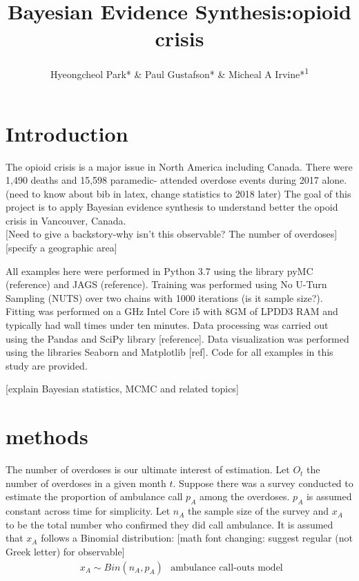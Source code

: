 \documentclass[]{article}
\title{Bayesian Evidence Synthesis:opioid crisis}
\author{Hyeongcheol Park* \& Paul Gustafson* \& Micheal A Irvine*\textsuperscript{1}}
\begin{document}
\maketitle{}
\tableofcontents %
\listoffigures %
\listoftables %


\begin{abstract}

\end{abstract}

\section{Introduction}
The opioid crisis is a major issue in North America  including Canada. There were 1,490 deaths and 15,598 paramedic- attended overdose events during 2017 alone. \cite{Irvine:modelling} (need to know about bib in latex, change statistics to 2018 later) The goal of this project is to apply Bayesian evidence synthesis to understand better the opoid crisis in Vancouver, Canada.  \\

[Need to give a backstory-why isn't this observable? The number of overdoses] 
[specify a geographic area]

All examples here were performed in Python 3.7 using the library pyMC (reference) and JAGS (reference). Training was performed using No U-Turn Sampling (NUTS) over two chains with 1000 iterations (is it sample size?). Fitting was performed on a GHz Intel Core i5 with 8GM of LPDD3 RAM and typically had wall times under ten minutes. Data processing was carried out using the Pandas and SciPy library [reference]. Data visualization was performed using the libraries Seaborn and Matplotlib [ref]. Code for all examples in this study are provided. 

[explain Bayesian statistics, MCMC and related topics]

\section{methods}

\normalsize
The number of overdoses is our ultimate interest of estimation.  Let $O_t$ the number of overdoses in a given month $t$. Suppose there was a survey  conducted to estimate the proportion of ambulance call $p_A$ among the overdoses. $p_A$ is assumed constant across time for simplicity. Let $n_{A}$ the sample size of the survey and $x_{A}$ to be the total number who confirmed they did call ambulance. It is assumed that $x_{A}$ follows a Binomial distribution:
[math font changing: suggest regular (not Greek letter) for observable]
\begin{equation}
\label{ambulance}
\left.\begin{aligned}
x_{A} \sim Bin(n_{A},p_{A})\end{aligned}\right.
\text{		ambulance call-outs model}
\end{equation}
\end{document}
